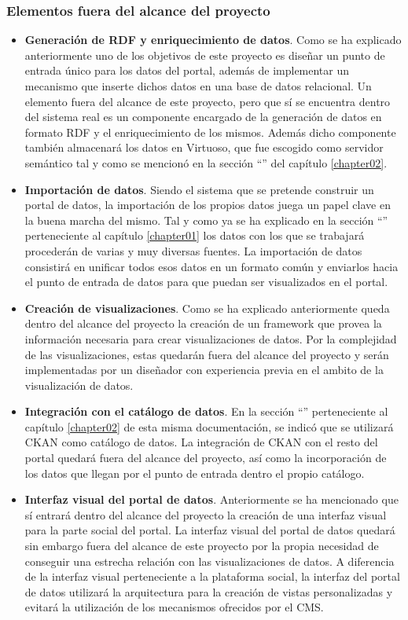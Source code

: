 \subsubsection{Elementos fuera del alcance del proyecto}
\begin{itemize}
\item \textbf{Generación de RDF y enriquecimiento de datos}.  Como se ha explicado anteriormente uno de los objetivos de este proyecto es diseñar un punto de entrada único para los datos del portal, además de implementar un mecanismo que inserte dichos datos en una base de datos relacional.  Un elemento fuera del alcance de este proyecto, pero que sí se encuentra dentro del sistema real es un componente encargado de la generación de datos en formato RDF y el enriquecimiento de los mismos.  Además dicho componente también almacenará los datos en Virtuoso, que fue escogido como servidor semántico tal y como se mencionó en la sección ``'' del capítulo \ref{chapter02}.
\item \textbf{Importación de datos}.  Siendo el sistema que se pretende construir un portal de datos, la importación de los propios datos juega un papel clave en la buena marcha del mismo.  Tal y como ya se ha explicado en la sección ``'' perteneciente al capítulo \ref{chapter01} los datos con los que se trabajará procederán de varias y muy diversas fuentes.  La importación de datos consistirá en unificar todos esos datos en un formato común y enviarlos hacia el punto de entrada de datos para que puedan ser visualizados en el portal.
\item \textbf{Creación de visualizaciones}.  Como se ha explicado anteriormente queda dentro del alcance del proyecto la creación de un framework que provea la información necesaria para crear visualizaciones de datos.  Por la complejidad de las visualizaciones, estas quedarán fuera del alcance del proyecto y serán implementadas por un diseñador con experiencia previa en el ambito de la visualización de datos.
\item \textbf{Integración con el catálogo de datos}.  En la sección ``'' perteneciente al capítulo \ref{chapter02} de esta misma documentación, se indicó que se utilizará CKAN como catálogo de datos.  La integración de CKAN con el resto del portal quedará fuera del alcance del proyecto, así como la incorporación de los datos que llegan por el punto de entrada dentro el propio catálogo. 
\item \textbf{Interfaz visual del portal de datos}.  Anteriormente se ha mencionado que sí entrará dentro del alcance del proyecto la creación de una interfaz visual para la parte social del portal.  La interfaz visual del portal de datos quedará sin embargo fuera del alcance de este proyecto por la propia necesidad de conseguir una estrecha relación con las visualizaciones de datos.  A diferencia de la interfaz visual perteneciente a la plataforma social, la interfaz del portal de datos utilizará la arquitectura para la creación de vistas personalizadas y evitará la utilización de los mecanismos ofrecidos por el CMS.
\end{itemize}